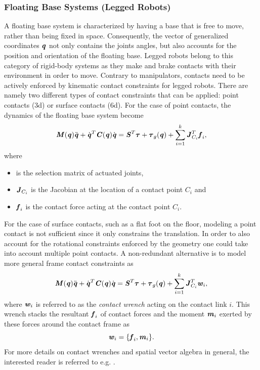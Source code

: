 \subsubsection{Floating Base Systems (Legged Robots)}
A floating base system is characterized by having a base that is free to move, rather than being fixed in space. Consequently, the vector of generalized coordinates $\bm{\mathit{q}}$ not only contains the joints angles, but also accounts for the position and orientation of the floating base. Legged robots belong to this category of rigid-body systems as they make and brake contacts with their environment in order to move. Contrary to manipulators, contacts need to be actively enforced by kinematic contact constraints for legged robots. There are namely two different types of contact constraints that can be applied: point contacts (3d) or surface contacts (6d). 
For the case of point contacts, the dynamics of the floating base system become
\begin{equation*} \label{eqn:EoMLeggedRobotPtContact}
\bm{\mathit{M}}(\bm{\mathit{q}})\ddot{\bm{\mathit{q}}}+\dot{\bm{\mathit{q}}}^T\bm{\mathit{C}}(\bm{\mathit{q}})\dot{\bm{\mathit{q}}}=\bm{\mathit{S}}^T\bm{\mathit{\tau}}+\bm{\mathit{\tau}}_g(\bm{\mathit{q}})+\sum_{i=1}^{k}\bm{\mathit{J}}_{C_i}^T\bm{\mathit{f}}_i,
\end{equation*}
where 
\begin{itemize}
\item {} is the selection matrix of actuated joints,
\item $\bm{\mathit{J}}_{C_i}$ is the Jacobian at the location of a contact point $C_i$ and
\item $\bm{\mathit{f}}_i$ is the contact force acting at the contact point $C_i$.
\end{itemize}
For the case of surface contacts, such as a flat foot on the floor, modeling a point contact is not sufficient since it only constrains the translation. In order to also account for the rotational constraints enforced by the geometry one could take into account multiple point contacts. A non-redundant alternative is to model more general frame contact constraints as
\begin{equation*} \label{eqn:EoMLeggedRobotSurfaceContact}
\bm{\mathit{M}}(\bm{\mathit{q}})\ddot{\bm{\mathit{q}}}+\dot{\bm{\mathit{q}}}^T\bm{\mathit{C}}(\bm{\mathit{q}})\dot{\bm{\mathit{q}}}=\bm{\mathit{S}}^T\bm{\mathit{\tau}}+\bm{\mathit{\tau}}_g(\bm{\mathit{q}})+\sum_{i=1}^{k}\bm{\mathit{J}}_{C_i}^T\bm{\mathit{w}}_i,
\end{equation*}
where $\bm{\mathit{w}}_i$ is referred to as the \textit{contact wrench} acting on the contact link $i$. This wrench stacks the resultant $\bm{\mathit{f}}_i$ of contact forces and the moment $\bm{\mathit{m}}_i$ exerted by these forces around the contact frame as
$$\bm{\mathit{w}}_i=\{\bm{\mathit{f}}_i,\bm{\mathit{m}}_i\}.$$ 
For more details on contact wrenches and spatial vector algebra in general, the interested reader is referred to e.g. \cite[Ch.2]{featherstone2014rigid}.

